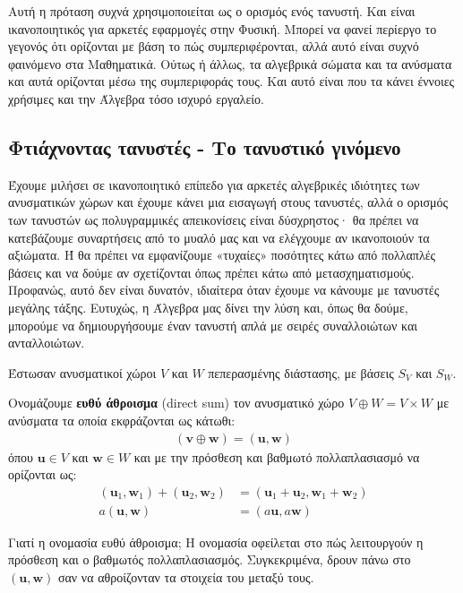 \documentclass[main.tex]{subfiles}
\begin{document}
	Αυτή η πρόταση συχνά χρησιμοποιείται ως ο ορισμός ενός τανυστή. Και είναι ικανοποιητικός για αρκετές εφαρμογές στην Φυσική. Μπορεί να φανεί περίεργο το γεγονός ότι ορίζονται με βάση το πώς συμπεριφέρονται, αλλά αυτό είναι συχνό φαινόμενο στα Μαθηματικά. Ούτως ή άλλως, τα αλγεβρικά σώματα και τα ανύσματα και αυτά ορίζονται μέσω της συμπεριφοράς τους. Και αυτό είναι που τα κάνει έννοιες χρήσιμες και την Άλγεβρα τόσο ισχυρό εργαλείο. 
	
	\subsection{Φτιάχνοντας τανυστές - Το τανυστικό γινόμενο}
	Έχουμε μιλήσει σε ικανοποιητικό επίπεδο για αρκετές αλγεβρικές ιδιότητες των ανυσματικών χώρων και έχουμε κάνει μια εισαγωγή στους τανυστές, αλλά ο ορισμός των τανυστών ως πολυγραμμικές απεικονίσεις είναι δύσχρηστος· θα πρέπει να κατεβάζουμε συναρτήσεις από το μυαλό μας και να ελέγχουμε αν ικανοποιούν τα αξιώματα. Ή θα πρέπει να εμφανίζουμε «τυχαίες» ποσότητες κάτω από πολλαπλές βάσεις και να δούμε αν σχετίζονται όπως πρέπει κάτω από μετασχηματισμούς. Προφανώς, αυτό δεν είναι δυνατόν, ιδιαίτερα όταν έχουμε να κάνουμε με τανυστές μεγάλης τάξης. Ευτυχώς, η Άλγεβρα μας δίνει την λύση και, όπως θα δούμε, μπορούμε να δημιουργήσουμε έναν τανυστή απλά με σειρές συναλλοιώτων και ανταλλοιώτων.
	
	
	\begin{definition}
		Έστωσαν ανυσματικοί χώροι $V$ και $W$ πεπερασμένης διάστασης, με βάσεις $S_V$ και $S_W$.
		
		Ονομάζουμε \textbf{ευθύ άθροισμα} (direct sum) τον ανυσματικό χώρο ${V\oplus W = V\times W}$ με ανύσματα τα οποία εκφράζονται ως κάτωθι:
		\begin{align*}
			(\boldsymbol{v}\oplus\boldsymbol{w}) = (\boldsymbol{u}, \boldsymbol{w})
		\end{align*}
		όπου ${\boldsymbol{u}\in V}$ και ${\boldsymbol{w}\in W}$ και με την πρόσθεση και βαθμωτό πολλαπλασιασμό να ορίζονται ως:
		\begin{align*}
			(\boldsymbol{u}_1, \boldsymbol{w}_1) + (\boldsymbol{u}_2, \boldsymbol{w}_2) &= (\boldsymbol{u}_1 + \boldsymbol{u}_2, \boldsymbol{w}_1 + \boldsymbol{w}_2)\\
			a(\boldsymbol{u}, \boldsymbol{w}) &= (a\boldsymbol{u}, a\boldsymbol{w})
		\end{align*}
	\end{definition}

	Γιατί η ονομασία ευθύ άθροισμα; Η ονομασία οφείλεται στο πώς λειτουργούν η πρόσθεση και ο βαθμωτός πολλαπλασιασμός. Συγκεκριμένα, δρουν πάνω στο $(\boldsymbol{u},\boldsymbol{w})$ σαν να αθροίζονταν τα στοιχεία του μεταξύ τους.
	
\end{document}
